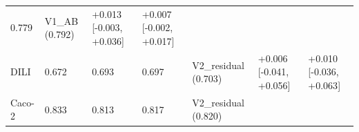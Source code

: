 \documentclass[
  10pt,
]{article}
\begin{document}
\begin{longtable}[]{@{}lllllll@{}}
\begin{minipage}[t]{0.12\columnwidth}
0.779\strut
\end{minipage} & \begin{minipage}[t]{0.12\columnwidth}\raggedright
V1\_AB (0.792)\strut
\end{minipage} & \begin{minipage}[t]{0.12\columnwidth}\raggedright
+0.013 {[}-0.003, +0.036{]}\strut
\end{minipage} & \begin{minipage}[t]{0.12\columnwidth}\raggedright
+0.007 {[}-0.002, +0.017{]}\strut
\end{minipage}\tabularnewline
\begin{minipage}[t]{0.12\columnwidth}\raggedright
DILI\strut
\end{minipage} & \begin{minipage}[t]{0.12\columnwidth}\raggedright
0.672\strut
\end{minipage} & \begin{minipage}[t]{0.12\columnwidth}\raggedright
0.693\strut
\end{minipage} & \begin{minipage}[t]{0.12\columnwidth}\raggedright
0.697\strut
\end{minipage} & \begin{minipage}[t]{0.12\columnwidth}\raggedright
V2\_residual (0.703)\strut
\end{minipage} & \begin{minipage}[t]{0.12\columnwidth}\raggedright
+0.006 {[}-0.041, +0.056{]}\strut
\end{minipage} & \begin{minipage}[t]{0.12\columnwidth}\raggedright
+0.010 {[}-0.036, +0.063{]}\strut
\end{minipage}\tabularnewline
\begin{minipage}[t]{0.12\columnwidth}\raggedright
Caco-2\strut
\end{minipage} & \begin{minipage}[t]{0.12\columnwidth}\raggedright
0.833\strut
\end{minipage} & \begin{minipage}[t]{0.12\columnwidth}\raggedright
0.813\strut
\end{minipage} & \begin{minipage}[t]{0.12\columnwidth}\raggedright
0.817\strut
\end{minipage} & \begin{minipage}[t]{0.12\columnwidth}\raggedright
V2\_residual (0.820)\strut
\end{minipage} & \begin{minipage}[t]{0.12\columnwidth}\raggedright

\end{minipage}
\end{longtable}
\end{document}
